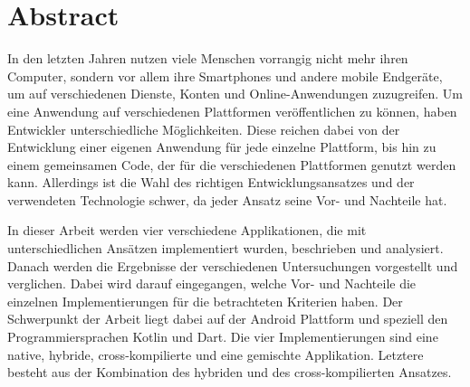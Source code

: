 \chapter*{Abstract}

\bigskip 

In den letzten Jahren nutzen viele Menschen vorrangig nicht mehr ihren Computer, sondern vor allem ihre Smartphones und andere mobile Endgeräte, um auf verschiedenen Dienste, Konten und Online-Anwendungen zuzugreifen. Um eine Anwendung auf verschiedenen Plattformen veröffentlichen zu können, haben Entwickler unterschiedliche Möglichkeiten. Diese reichen dabei von der Entwicklung einer eigenen Anwendung für jede einzelne Plattform, bis hin zu einem gemeinsamen Code, der für die verschiedenen Plattformen genutzt werden kann. Allerdings ist die Wahl des richtigen Entwicklungsansatzes und der verwendeten  Technologie schwer, da jeder Ansatz seine Vor- und Nachteile hat. 

In dieser Arbeit werden vier verschiedene Applikationen, die mit unterschiedlichen Ansätzen implementiert wurden, beschrieben und analysiert. Danach werden die Ergebnisse der verschiedenen Untersuchungen vorgestellt und verglichen. Dabei wird darauf eingegangen, welche Vor- und Nachteile die einzelnen Implementierungen für die betrachteten Kriterien haben. Der Schwerpunkt der Arbeit liegt dabei auf der Android Plattform und speziell den Programmiersprachen Kotlin und Dart. Die vier Implementierungen sind eine native, hybride, cross-kompilierte und eine gemischte Applikation. Letztere besteht aus der Kombination des hybriden und des cross-kompilierten Ansatzes.